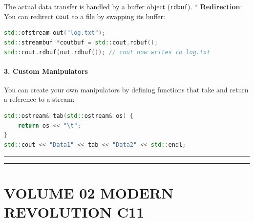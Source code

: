 The actual data transfer is handled by a buffer object
(\passthrough{\lstinline!rdbuf!}). * \textbf{Redirection}: You can
redirect \passthrough{\lstinline!cout!} to a file by swapping its
buffer:

\begin{lstlisting}[language={C++}]
std::ofstream out("log.txt");
std::streambuf *coutbuf = std::cout.rdbuf(); 
std::cout.rdbuf(out.rdbuf()); // cout now writes to log.txt
\end{lstlisting}

\hypertarget{custom-manipulators}{%
\subsubsection{3. Custom Manipulators}\label{custom-manipulators}}

You can create your own manipulators by defining functions that take and
return a reference to a stream:

\begin{lstlisting}[language={C++}]
std::ostream& tab(std::ostream& os) {
    return os << "\t";
}
std::cout << "Data1" << tab << "Data2" << std::endl;
\end{lstlisting}

\begin{center}\rule{0.5\linewidth}{0.5pt}\end{center}

\begin{center}\rule{0.5\linewidth}{0.5pt}\end{center}

\hypertarget{volume-02-modern-revolution-c11}{%
\chapter{VOLUME 02 MODERN REVOLUTION
C11}\label{volume-02-modern-revolution-c11}}
